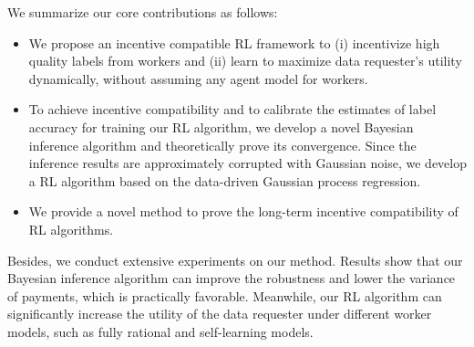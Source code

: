 


We summarize our core contributions as follows:
\begin{itemize}[topsep=0pt,  itemsep=0pt]
\item We propose an incentive compatible RL framework to (i) incentivize high quality labels from workers and (ii) learn to maximize data requester's utility dynamically, without assuming any agent model for workers.  
\item To achieve incentive compatibility and to calibrate the estimates of label accuracy for training our RL algorithm, we develop a novel Bayesian inference algorithm and theoretically prove its convergence. Since the inference results are approximately corrupted with Gaussian noise, we develop a RL algorithm based on the data-driven Gaussian process regression. 
\item We provide a novel method to prove the long-term incentive compatibility of RL algorithms.
\end{itemize}
Besides, we conduct extensive experiments on our method. Results show that our Bayesian inference algorithm can improve the robustness and lower the variance of payments, which is practically favorable. Meanwhile, our RL algorithm can significantly increase the utility of the data requester under different worker models, such as fully rational and self-learning models. 

